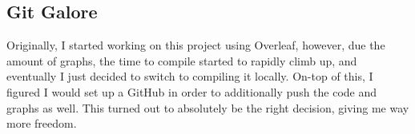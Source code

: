\documentclass[12pt, letterpaper]{article}
\begin{document}
    \subsection{Git Galore}
    Originally, I started working on this project using Overleaf, however, due the amount of graphs, the time to compile started to rapidly climb up, and eventually I just decided to switch to compiling it locally. On-top of this, I figured I would set up a GitHub in order to additionally push the code and graphs as well. This turned out to absolutely be the right decision, giving me way more freedom.
    
\printbibliography[
heading=bibintoc,
title={\centering Sources}
]
\end{document}

